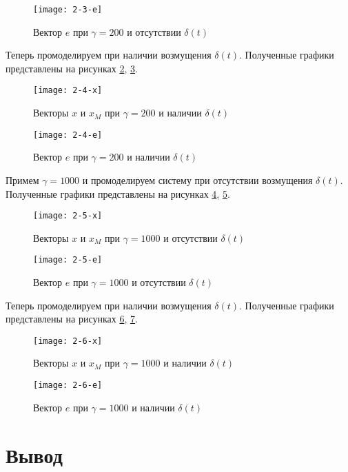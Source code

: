 \documentclass[14pt, a4paper]{extarticle}
\begin{document}
\begin{enumerate}
		\begin{figure}[H]
			\centering
			\texttt{[image: 2-3-e]}
			\caption{Вектор $e$ при $\gamma=200$ и отсутствии $\delta(t)$}
			\label{fig:2-3-e}
		\end{figure}
		
		Теперь промоделируем при наличии возмущения $\delta(t)$. Полученные графики представлены на рисунках \ref{fig:2-4-x}, \ref{fig:2-4-e}.
		
		\begin{figure}[H]
			\centering
			\texttt{[image: 2-4-x]}
			\caption{Векторы $x$ и $x_M$ при $\gamma=200$ и наличии $\delta(t)$}
			\label{fig:2-4-x}
		\end{figure}
		
		\begin{figure}[H]
			\centering
			\texttt{[image: 2-4-e]}
			\caption{Вектор $e$ при $\gamma=200$ и наличии $\delta(t)$}
			\label{fig:2-4-e}
		\end{figure}
		
		Примем $\gamma=1000$ и промоделируем систему при отсутствии возмущения $\delta(t)$. Полученные графики представлены на рисунках \ref{fig:2-5-x}, \ref{fig:2-5-e}.
		
		\begin{figure}[H]
			\centering
			\texttt{[image: 2-5-x]}
			\caption{Векторы $x$ и $x_M$ при $\gamma=1000$ и отсутствии $\delta(t)$}
			\label{fig:2-5-x}
		\end{figure}
		
		\begin{figure}[H]
			\centering
			\texttt{[image: 2-5-e]}
			\caption{Вектор $e$ при $\gamma=1000$ и отсутствии $\delta(t)$}
			\label{fig:2-5-e}
		\end{figure}
		
		Теперь промоделируем при наличии возмущения $\delta(t)$. Полученные графики представлены на рисунках \ref{fig:2-6-x}, \ref{fig:2-6-e}.
		
		\begin{figure}[H]
			\centering
			\texttt{[image: 2-6-x]}
			\caption{Векторы $x$ и $x_M$ при $\gamma=1000$ и наличии $\delta(t)$}
			\label{fig:2-6-x}
		\end{figure}
		
		\begin{figure}[H]
			\centering
			\texttt{[image: 2-6-e]}
			\caption{Вектор $e$ при $\gamma=1000$ и наличии $\delta(t)$}
			\label{fig:2-6-e}
		\end{figure}
		
		
		
	\end{enumerate}

	\newpage
	
	\section*{Вывод}
	
\end{document}
